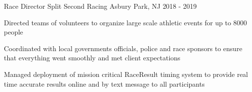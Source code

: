 
\begin{cventries}
  \cventry
    {Race Director} %
    {Split Second Racing} %
    {Asbury Park, NJ} %
    {2018 - 2019} %
    {
      \begin{cvitems} %
        \item {Directed teams of volunteers to organize large scale athletic events for up to 8000 people}
		\item {Coordinated with local governments officials, police and race sponsors to ensure that everything went smoothly and met client expectations}
		\item {Managed deployment of mission critical RaceResult timing system to provide real time accurate results online and by text message to all participants}
      \end{cvitems}
    }


\end{cventries}
